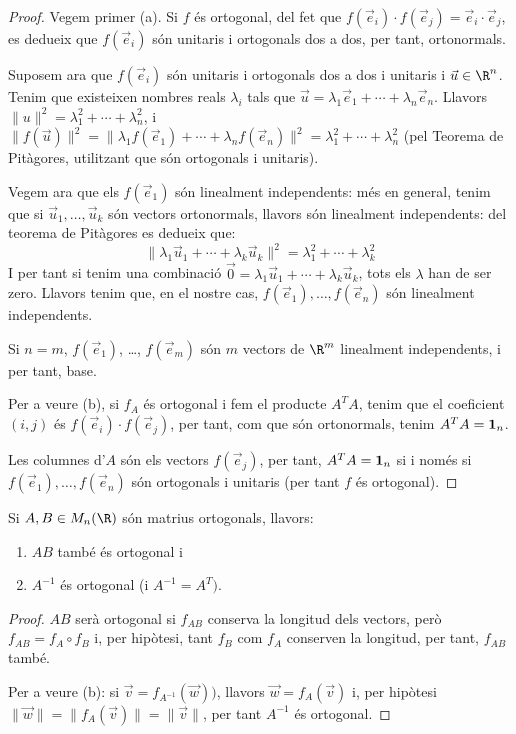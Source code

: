 \begin{proof}
Vegem primer (a). Si $f$ és ortogonal, del fet que $f(\vec e_i)\cdot f(\vec e_j)=\vec e_i\cdot \vec e_j$, es dedueix que $f(\vec e_i)$ són unitaris i ortogonals dos a dos, per tant, ortonormals.

Suposem ara que $f(\vec e_i)$ són unitaris i ortogonals dos a dos i unitaris i $\vec u \in \R^n$. Tenim que existeixen nombres reals $\lambda_i$ tals que $\vec u= \lambda_1\vec e_1+ \cdots + \lambda_n\vec e_n$. Llavors $\|u\|^2=\lambda_1^2+ \cdots + \lambda_n^2$, i $\|f(\vec u)\|^2=\|\lambda_1 f(\vec e_1)+\cdots + \lambda_n f(\vec e_n)\|^2=\lambda_1^2+ \cdots + \lambda_n^2$ (pel Teorema de Pitàgores, utilitzant que són ortogonals i unitaris). 

Vegem ara que els $f(\vec e_1)$ són linealment independents: més en general, tenim que si $\vec u_1, \dots, \vec u_k$ són vectors ortonormals, llavors són linealment independents: del teorema de Pitàgores es dedueix que:
\[
\|\lambda_1\vec u_1 + \cdots + \lambda_k \vec u_k\|^2=\lambda_1^2 + \cdots + \lambda_k^2
\]
I per tant si tenim una combinació $\vec 0 = \lambda_1\vec u_1 + \cdots + \lambda_k \vec u_k$, tots els $\lambda$ han de ser zero. Llavors tenim que, en el nostre cas, $f(\vec e_1), \dots, f(\vec e_n)$ són linealment independents.

Si $n=m$, $f(\vec e_1)$, \ldots, $f(\vec e_m)$ són $m$ vectors de $\R^m$ linealment independents, i per tant, base.

Per a veure (b), si $f_A$ és ortogonal i fem el producte $A^TA$, tenim que el coeficient $(i,j)$ és $f(\vec e_i)\cdot f(\vec e_j)$, per tant, com que són ortonormals, tenim $A^TA=\mathbf{1}_n$.

Les columnes d'$A$ són els vectors $f(\vec e_j)$, per tant, $A^TA=\mathbf{1}_n$ si i només si  $f(\vec e_1), \dots, f(\vec e_n)$ són ortogonals i unitaris (per tant $f$ és ortogonal).
\end{proof}
\begin{teorema}
Si $A,B \in M_n(\R)$ són matrius ortogonals, llavors:
\begin{enumerate}[\rm (a)]
    \item $AB$ també és ortogonal i
    \item $A^{-1}$ és ortogonal (i $A^{-1}=A^T)$.
\end{enumerate}
\end{teorema}
\begin{proof}
$AB$ serà ortogonal si $f_{AB}$ conserva la longitud dels vectors, però $f_{AB}=f_A \circ f_B$ i, per hipòtesi, tant $f_B$ com $f_A$ conserven la longitud, per tant, $f_{AB}$ també.

Per a veure (b): si $\vec v = f_{A^{-1}}(\vec w))$, llavors $\vec w=f_A(\vec v)$ i, per hipòtesi $\|\vec w\|=\|f_A(\vec v)\|=\|\vec v\|$, per tant $A^{-1}$ és ortogonal. 
\end{proof}

